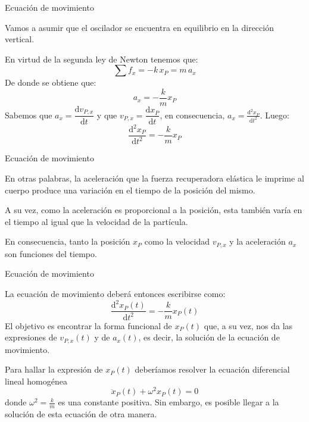 \documentclass[11pt,handout,aspectratio=1610]{beamer}
\newcommand{\fdiff}[2]{\dfrac{\text{d} #1}{\text{d} #2}}
\newcommand{\fddiff}[2]{\frac{\text{d}^2 #1}{\text{d} #2^2}}
\newcommand{\vs}{\vspace{11pt}}
\begin{document}
\begin{frame}{Ecuación de movimiento}

    Vamos a asumir que el oscilador se encuentra en equilibrio en la dirección vertical.

    \vs

    En virtud de la segunda ley de Newton tenemos que: $$\sum f_x = - k \, x_P = m \, a_x$$ De donde se obtiene que: $$a_x = - \frac{k}{m} x_P$$ Sabemos que $a_x = \fdiff{v_{P,x}}{t}$ y que $v_{P,x} = \fdiff{x_P}{t}$, en consecuencia, $a_x = \fddiff{x_P}{t}$. Luego: $$\fddiff{x_P}{t} = - \frac{k}{m} x_P$$

\end{frame}

\begin{frame}{Ecuación de movimiento}

    En otras palabras, la aceleración que la fuerza recuperadora elástica le imprime al cuerpo produce una variación en el tiempo de la posición del mismo. 
    
    \vspace{11pt}
    
    A su vez, como la aceleración es proporcional a la posición, esta también varía en el tiempo al igual que la velocidad de la partícula. 
    
    \vspace{11pt}
    
    En consecuencia, tanto la posición $x_P$ como la velocidad $v_{P,x}$ y la aceleración $a_x$ son funciones del tiempo. 

\end{frame}

\begin{frame}{Ecuación de movimiento}

    La ecuación de movimiento deberá entonces escribirse como: $$\fddiff{x_P (t)}{t} = - \frac{k}{m} x_P (t)$$ El objetivo es encontrar la forma funcional de $x_P (t)$ que, a su vez, nos da las expresiones de $v_{P,x} (t)$ y de $a_{x} (t)$, es decir, la solución de la ecuación de movimiento.

    \vspace{11pt}

    Para hallar la expresión de $x_P (t)$ deberíamos resolver la ecuación diferencial lineal homogénea $$\ddot{x}_P (t) + \omega^2 x_P (t) = 0$$ donde $\omega^2 = \frac{k}{m}$ es una constante positiva. Sin embargo, es posible llegar a la solución de esta ecuación de otra manera.

\end{frame}
\end{document}
